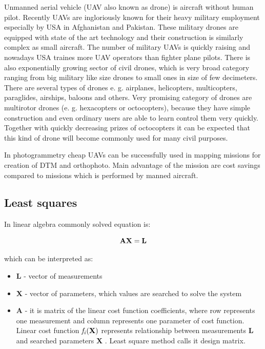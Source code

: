 \documentclass[a4paper,12pt]{article}
\newcommand{\ematr}[1]{
{\bf #1}
}
\newcommand{\evect}[1]{
{\bf #1}
}
\newcommand{\efunc}[1]{
{\it #1}
}
\begin{document}
Unmanned aerial vehicle (UAV also known as drone) is aircraft without human pilot. Recently UAVs are ingloriously known for
their heavy military employment especially by USA in Afghanistan and Pakistan. These military drones are equipped with state of the art 
technology and their construction is similarly complex as small aircraft.  
The number of military UAVs is quickly raising and nowadays USA traines more UAV operators than fighter plane pilots. 
There is also exponentially growing sector of civil drones, which is very broad category ranging
from big military like size drones to small ones in size of few decimeters. There are several types of drones e. g. airplanes,
helicopters, multicopters, paraglides, airships, baloons and others. 
Very promising category of drones are multirotor drones (e. g. hexacopters or octocopters), because they have simple construction and 
even ordinary users are able to learn control them very quickly. Together with quickly decreasing prizes of octocopters it can be expected 
that this kind of drone will become commonly used for many civil purposes.

In photogrammetry cheap UAVs can be successfully used in mapping missions for creation of DTM and orthophoto.
Main advantage of the mission are cost savings compared to missions which is performed by manned aircraft.

\subsection{Least squares}
\label{sec:least}


In linear algebra commonly solved equation is:

\begin{equation}
\label{eq:linear_eq}
\ematr{A}\evect{X} = \evect{L} 
\end{equation} 

which can be interpreted as:
\begin{itemize}
\item \evect{L} - vector of measurements
\item \evect{X} - vector of parameters, which values are searched to solve the system
\item \ematr{A} - it is matrix of the linear cost function  coefficients,  where row represents one measurement 
		  and column represents one parameter of cost function. Linear cost function $\efunc{f_{i}(\evect{X})}$
		  represents relationship between measurements \evect{L} and searched parameters \evect{X}. 
		  Least square method calls it design matrix. 
\end{itemize}
\end{document}
